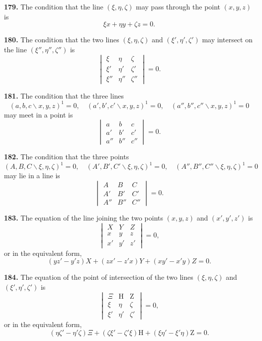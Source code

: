 \documentclass[11pt,a4paper]{book}
\begin{document}
\begin{center}
\textbf{179.} The condition that the line $(\xi,\eta,\zeta)$ may pass through the point $(x,y,z)$ is
\[
\xi x + \eta y + \zeta z = 0.
\]

\textbf{180.} The condition that the two lines $(\xi,\eta,\zeta)$ and $(\xi',\eta',\zeta')$ may intersect
on the line $(\xi'',\eta'',\zeta'')$ is
\[
\begin{vmatrix}
\xi & \eta & \zeta \\
\xi' & \eta' & \zeta' \\
\xi'' & \eta'' & \zeta''
\end{vmatrix} = 0.
\]

\textbf{181.} The condition that the three lines
\[
(a,b,c\!\backslash x,y,z)^1=0,\quad (a',b',c'\!\backslash x,y,z)^1=0,\quad (a'',b'',c''\!\backslash x,y,z)^1=0
\]
may meet in a point is
\[
\begin{vmatrix}
a & b & c \\
a' & b' & c' \\
a'' & b'' & c''
\end{vmatrix} = 0.
\]

\textbf{182.} The condition that the three points
\[
(A,B,C\!\backslash \xi,\eta,\zeta)^1=0,\quad (A',B',C'\!\backslash \xi,\eta,\zeta)^1=0,\quad (A'',B'',C''\!\backslash \xi,\eta,\zeta)^1=0
\]
may lie in a line is
\[
\begin{vmatrix}
A & B & C \\
A' & B' & C' \\
A'' & B'' & C''
\end{vmatrix} = 0.
\]

\textbf{183.} The equation of the line joining the two points $(x,y,z)$ and $(x',y',z')$ is
\[
\begin{vmatrix}
X & Y & Z \\
x & y & z \\
x' & y' & z'
\end{vmatrix} = 0,
\]
or in the equivalent form,
\[
(yz'-y'z)X + (zx'-z'x)Y + (xy'-x'y)Z = 0.
\]

\textbf{184.} The equation of the point of intersection of the two lines
$(\xi,\eta,\zeta)$ and $(\xi',\eta',\zeta')$ is
\[
\begin{vmatrix}
\Xi & \mathrm{H} & \mathrm{Z} \\
\xi & \eta & \zeta \\
\xi' & \eta' & \zeta'
\end{vmatrix} = 0,
\]
or in the equivalent form,
\[
(\eta\zeta'-\eta'\zeta)\Xi + (\zeta\xi'-\zeta'\xi)\mathrm{H} + (\xi\eta'-\xi'\eta)\mathrm{Z} = 0.
\]


\end{center}
\end{document}
